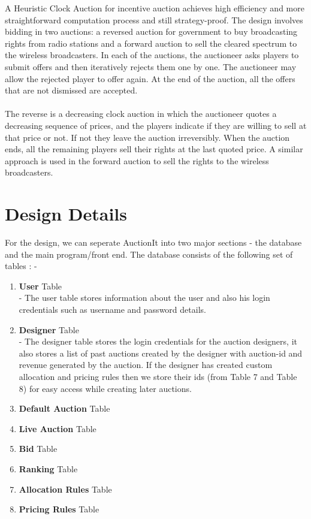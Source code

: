 \documentclass[a4paper]{article}
\begin{document}
A Heuristic Clock Auction for incentive auction achieves high efficiency and more straightforward computation process and still strategy-proof. The design involves bidding in two auctions: a reversed auction for government to buy broadcasting rights from radio stations and a forward auction to sell the cleared spectrum to the wireless broadcasters. In each of the auctions, the auctioneer asks players to submit offers and then iteratively rejects them one by one. The auctioneer may allow the rejected player to offer again. At the end of the auction, all the offers that are not dismissed are accepted.
\\\\
The reverse is a decreasing clock auction in which the auctioneer quotes a decreasing sequence of prices, and the players indicate if they are willing to sell at that price or not. If not they leave the auction irreversibly. When the auction ends, all the remaining players sell their rights at the last quoted price. A similar approach is used in the forward auction to sell the rights to the wireless broadcasters.


\section*{Design Details}
For the design, we can seperate AuctionIt into two major sections -  the database and the main program/front end. The database consists of the following set of tables : - \\
\begin{enumerate}
    \item \textbf{User} Table\\
     - The user table stores information about the user and also his login credentials such as username and password details.\\
    \item \textbf{Designer} Table\\
    - The designer table stores the login credentials for the auction designers, it also stores a list of past auctions created by the designer with auction-id and revenue generated by the auction. If the designer has created custom allocation and pricing rules then we store their ids (from Table 7 and Table 8) for easy access while creating later auctions.
    \item \textbf{Default Auction} Table
    \item \textbf{Live Auction} Table
    \item \textbf{Bid} Table
    \item \textbf{Ranking} Table
    \item \textbf{Allocation Rules} Table
    \item \textbf{Pricing Rules} Table
\end{enumerate}
\end{document}
